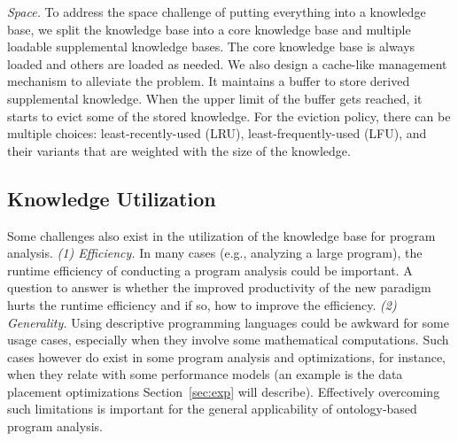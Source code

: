 {\em Space.} 
To address the space challenge of putting everything into a knowledge
base, we split the knowledge base into a core knowledge base and
multiple loadable supplemental knowledge bases.  The core knowledge
base is always loaded and others are loaded as needed.  We also design
a cache-like management mechanism to alleviate the problem. It
maintains a buffer to store derived supplemental knowledge. When the
upper limit of the buffer gets reached, it starts to evict some of the
stored knowledge.
  For the eviction policy, there can be multiple choices:
  least-recently-used (LRU), least-frequently-used (LFU), and their
  variants that are weighted with the size of the knowledge. 

\subsection{Knowledge Utilization}

\vspace*{.1in} Some challenges also exist in
the utilization of the knowledge base for program analysis.  {\em (1)
  Efficiency.}  In many cases (e.g., analyzing a large program), the
runtime efficiency of conducting a program analysis could be
important. A question to answer is whether the improved productivity
of the new paradigm hurts the runtime efficiency and if so, how to
improve the efficiency. {\em (2) Generality.}  Using descriptive
programming languages could be awkward for some usage cases,
especially when they involve some mathematical computations. Such
cases however do exist in some program analysis and optimizations, for
instance, when they relate with some performance models (an example is
the data placement optimizations Section~\ref{sec:exp} will
describe). Effectively overcoming such limitations is important for
the general applicability of ontology-based program analysis.

